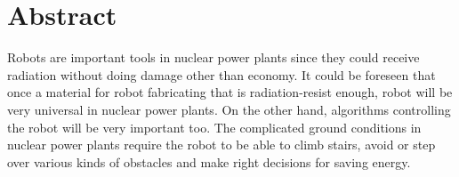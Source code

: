\chapter*{Abstract}
\label{sec:abstractEng}

Robots are important tools in nuclear power plants since they could receive radiation without doing
damage other than economy.
It could be foreseen that once a material for robot fabricating that is radiation-resist enough,
robot will be very universal in nuclear power plants.
On the other hand, algorithms controlling the robot will be very important too.
The complicated ground conditions in nuclear power plants require the robot to be able to climb stairs,
avoid or step over various kinds of obstacles and make right decisions for saving energy.

